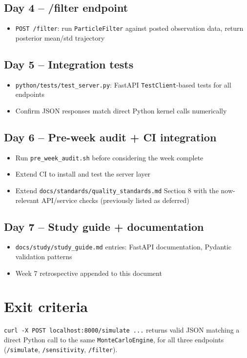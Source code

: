 \documentclass[11pt]{article}
\begin{document}
\subsection*{Day 4 -- /filter endpoint}
\begin{itemize}[leftmargin=*]
  \item \texttt{POST /filter}: run \texttt{ParticleFilter} against
    posted observation data, return posterior mean/std trajectory
\end{itemize}

\subsection*{Day 5 -- Integration tests}
\begin{itemize}[leftmargin=*]
  \item \texttt{python/tests/test\_server.py}: FastAPI
    \texttt{TestClient}-based tests for all endpoints
  \item Confirm JSON responses match direct Python kernel calls
    numerically
\end{itemize}

\subsection*{Day 6 -- Pre-week audit + CI integration}
\begin{itemize}[leftmargin=*]
  \item Run \texttt{pre\_week\_audit.sh} before considering the week
    complete
  \item Extend CI to install and test the server layer
  \item Extend \texttt{docs/standards/quality\_standards.md} Section 8
    with the now-relevant API/service checks (previously listed as
    deferred)
\end{itemize}

\subsection*{Day 7 -- Study guide + documentation}
\begin{itemize}[leftmargin=*]
  \item \texttt{docs/study/study\_guide.md} entries: FastAPI
    documentation, Pydantic validation patterns
  \item Week 7 retrospective appended to this document
\end{itemize}

\section*{Exit criteria}
\texttt{curl -X POST localhost:8000/simulate ...} returns valid JSON
matching a direct Python call to the same \texttt{MonteCarloEngine},
for all three endpoints (\texttt{/simulate}, \texttt{/sensitivity},
\texttt{/filter}).
\end{document}
